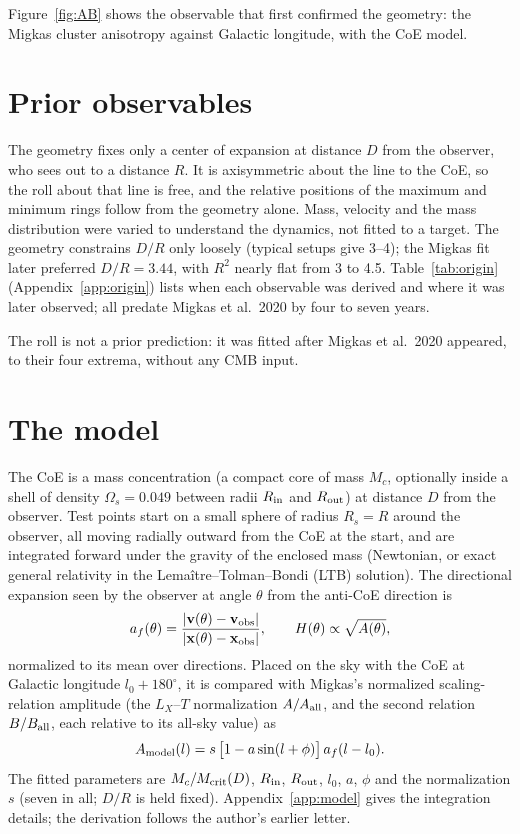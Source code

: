 \documentclass[11pt,a4paper]{article}
\newcommand{\dg}{^\circ}
\begin{document}
Figure~\ref{fig:AB} shows the observable that first confirmed the geometry: the Migkas cluster anisotropy against Galactic longitude, with the CoE model.

\section{Prior observables}\label{sec:origin}
The geometry fixes only a center of expansion at distance $D$ from the observer, who sees out to a distance $R$. It is axisymmetric about the line to the CoE, so the roll about that line is free, and the relative positions of the maximum and minimum rings follow from the geometry alone. Mass, velocity and the mass distribution were varied to understand the dynamics, not fitted to a target. The geometry constrains $D/R$ only loosely (typical setups give 3--4); the Migkas fit later preferred $D/R=3.44$, with $R^2$ nearly flat from 3 to 4.5. Table~\ref{tab:origin} (Appendix~\ref{app:origin}) lists when each observable was derived and where it was later observed; all predate Migkas et al.\ 2020 by four to seven years.


The roll is not a prior prediction: it was fitted after Migkas et al.\ 2020 appeared, to their four extrema, without any CMB input.

\section{The model}\label{sec:model}
The CoE is a mass concentration (a compact core of mass $M_c$, optionally inside a shell of density $\Omega_s=0.049$ between radii $R_{\rm in}$ and $R_{\rm out}$) at distance $D$ from the observer. Test points start on a small sphere of radius $R_s=R$ around the observer, all moving radially outward from the CoE at the start, and are integrated forward under the gravity of the enclosed mass (Newtonian, or exact general relativity in the Lemaître--Tolman--Bondi (LTB) solution). The directional expansion seen by the observer at angle $\theta$ from the anti-CoE direction is
\begin{equation}
a_f(\theta)=\frac{\lvert\mathbf v(\theta)-\mathbf v_{\rm obs}\rvert}{\lvert\mathbf x(\theta)-\mathbf x_{\rm obs}\rvert},\qquad H(\theta)\propto\sqrt{A(\theta)},
\end{equation}
normalized to its mean over directions. Placed on the sky with the CoE at Galactic longitude $l_0+180\dg$, it is compared with Migkas's normalized scaling-relation amplitude (the $L_X$--$T$ normalization $A/A_{\rm all}$, and the second relation $B/B_{\rm all}$, each relative to its all-sky value) as
\begin{equation}
A_{\rm model}(l)=s\,\bigl[1-a\sin(l+\phi)\bigr]\,a_f(l-l_0).
\end{equation}
The fitted parameters are $M_c/M_{\rm crit}(D)$, $R_{\rm in}$, $R_{\rm out}$, $l_0$, $a$, $\phi$ and the normalization $s$ (seven in all; $D/R$ is held fixed). Appendix~\ref{app:model} gives the integration details; the derivation follows the author's earlier letter.
\end{document}
